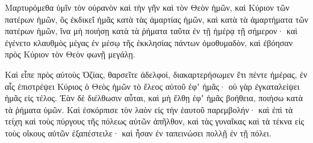 {Μαρτυρόμεθα ὑμῖν τὸν οὐρανὸν καὶ τὴν γῆν καὶ τὸν Θεὸν ἡμῶν, καὶ Κύριον τῶν πατέρων ἡμῶν, ὃς ἐκδικεῖ ἡμᾶς κατὰ τὰς ἁμαρτίας ἡμῶν, καὶ κατὰ τὰ ἁμαρτήματα τῶν πατέρων ἡμῶν, ἵνα μὴ ποιήσῃ κατὰ τὰ ῥήματα ταῦτα ἐν τῇ ἡμέρᾳ τῇ σήμερον·
καὶ ἐγένετο κλαυθμὸς μέγας ἐν μέσῳ τῆς ἐκκλησίας πάντων ὁμοθυμαδὸν, καὶ ἐβόησαν πρὸς Κύριον τὸν Θεὸν φωνῇ μεγάλῃ.
\par }{\PP {}Καὶ εἶπε πρὸς αὐτοὺς Ὀζίας, θαρσεῖτε ἀδελφοὶ, διακαρτερήσωμεν ἔτι πέντε ἡμέρας, ἐν αἷς ἐπιστρέψει Κύριος ὁ Θεὸς ἡμῶν τὸ ἔλεος αὐτοῦ ἐφʼ ἡμᾶς· οὐ γὰρ ἐγκαταλείψει ἡμᾶς εἰς τέλος.
Ἐὰν δὲ διέλθωσιν αὗται, καὶ μὴ ἔλθῃ ἐφʼ ἡμᾶς βοήθεια, ποιήσω κατὰ τὰ ῥήματα ὑμῶν.
Καὶ ἐσκόρπισε τὸν λαὸν εἰς τὴν ἑαυτοῦ παρεμβολήν· καὶ ἐπὶ τὰ τείχη καὶ τοὺς πύργους τῆς πόλεως αὐτῶν ἀπῆλθον, καὶ τὰς γυναῖκας καὶ τὰ τέκνα εἰς τοὺς οἴκους αὐτῶν ἐξαπέστειλε· καὶ ἦσαν ἐν ταπεινώσει πολλῇ ἐν τῇ πόλει.

}

